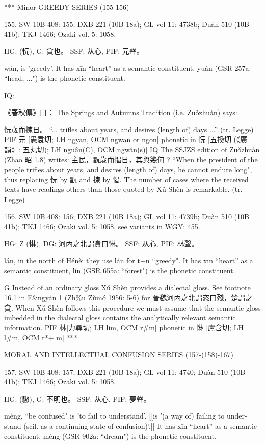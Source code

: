 ***
Minor GREEDY SERIES (155-156)

155. SW 10B 408: 155; DXB 221 (10B 18a); GL vol 11: 4738b; Duàn 510 (10B 41b); TKJ 1466; Ozaki vol. 5: 1058.

HG:             (忨),
G:	貪也。
SSF: 从心,
PIF: 元聲。


wán,
is 'greedy'.
It has xīn ``heart'' as a semantic constituent,
yuán (GSR 257a: ``head, ...") is the phonetic constituent.

IQ:

《春秋傳》曰： The Springs and Autumns Tradition (i.e. Zuǒzhuàn) says:

忨歲而揀日。 ``... trifles about years, and desires (length of) days ...'' (tr.
Legge)
PIF 元 [愚袁切; LH ngyan, OCM ngwan or ngon] phonetic in 忨 [五換切 (《廣韻》: 五丸切); LH nguân(C), OCM ngwân(s)]
IQ The SSJZS edition of Zuǒzhuàn (Zhāo 昭 1.8) writes: 主民，翫歲而愒日，其與幾何 ? ``When the president of the people trifles about years, and desires (length of) days, he cannot endure long", thus replacing 忨 by 翫 and 揀 by 愒. The number of cases where the received texts have readings others than those quoted by Xǔ Shèn is remarkable. (tr. Legge)


156. SW 10B 408: 156; DXB 221 (10B 18a); GL vol 11: 4739b; Duàn 510 (10B 41b); TKJ 1466; Ozaki vol. 5: 1058, see
variants in WGY: 455.

HG: Z (惏),
DG: 河內之北謂貪曰惏。
SSF: 从心,
PIF: 林聲。


lán,
in the north of Hénèi they use lán for t+n ``greedy". It has xīn ``heart'' as a semantic constituent,
lín (GSR 655a: ``forest") is the phonetic constituent.

G    Instead of an ordinary gloss Xǔ Shèn provides a dialectal gloss. See footnote 16.1 in F&ngyán 1 (Zh\%u Zǔmó 1956: 5-6) for 晉魏河內之北謂恣曰殘，楚謂之貪. When Xǔ Shèn follows this procedure we must assume that the semantic gloss imbedded in the dialectal gloss contains the analytically relevant semantic information.
PIF     林[力尋切; LH lim, OCM r\#m] phonetic in 惏 [盧含切; LH l\#m, OCM r*+ m]
***



MORAL AND INTELLECTUAL CONFUSION SERIES (157-(158)-167)

157. SW 10B 408: 157; DXB 221 (10B 18a); GL vol 11: 4740; Duàn 510 (10B 41b); TKJ 1466; Ozaki vol. 5: 1058.


HG:	(䮯),
G:	不明也。
SSF: 从心,
PIF: 夢聲。

mèng, ``be confused"
is 'to fail to understand'. [[is '(a way of) failing to under- stand (scil. as a continuing state of confusion)'.]]
It has xīn ``heart'' as a semantic constituent,
mèng (GSR 902a: ``dream") is the phonetic constituent.

